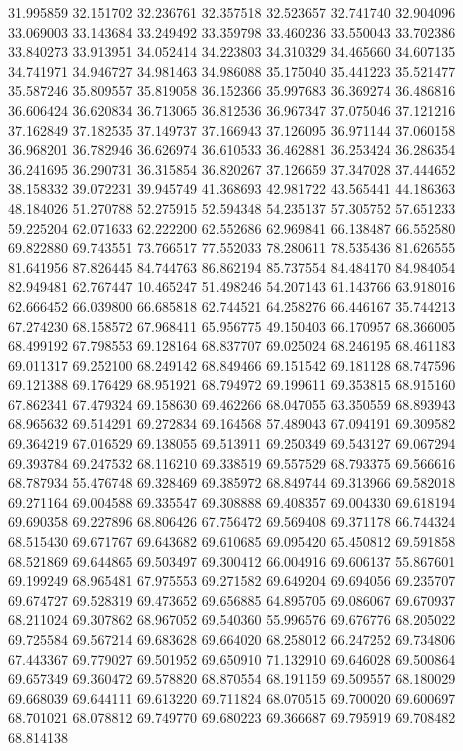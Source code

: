 31.995859
32.151702
32.236761
32.357518
32.523657
32.741740
32.904096
33.069003
33.143684
33.249492
33.359798
33.460236
33.550043
33.702386
33.840273
33.913951
34.052414
34.223803
34.310329
34.465660
34.607135
34.741971
34.946727
34.981463
34.986088
35.175040
35.441223
35.521477
35.587246
35.809557
35.819058
36.152366
35.997683
36.369274
36.486816
36.606424
36.620834
36.713065
36.812536
36.967347
37.075046
37.121216
37.162849
37.182535
37.149737
37.166943
37.126095
36.971144
37.060158
36.968201
36.782946
36.626974
36.610533
36.462881
36.253424
36.286354
36.241695
36.290731
36.315854
36.820267
37.126659
37.347028
37.444652
38.158332
39.072231
39.945749
41.368693
42.981722
43.565441
44.186363
48.184026
51.270788
52.275915
52.594348
54.235137
57.305752
57.651233
59.225204
62.071633
62.222200
62.552686
62.969841
66.138487
66.552580
69.822880
69.743551
73.766517
77.552033
78.280611
78.535436
81.626555
81.641956
87.826445
84.744763
86.862194
85.737554
84.484170
84.984054
82.949481
62.767447
10.465247
51.498246
54.207143
61.143766
63.918016
62.666452
66.039800
66.685818
62.744521
64.258276
66.446167
35.744213
67.274230
68.158572
67.968411
65.956775
49.150403
66.170957
68.366005
68.499192
67.798553
69.128164
68.837707
69.025024
68.246195
68.461183
69.011317
69.252100
68.249142
68.849466
69.151542
69.181128
68.747596
69.121388
69.176429
68.951921
68.794972
69.199611
69.353815
68.915160
67.862341
67.479324
69.158630
69.462266
68.047055
63.350559
68.893943
68.965632
69.514291
69.272834
69.164568
57.489043
67.094191
69.309582
69.364219
67.016529
69.138055
69.513911
69.250349
69.543127
69.067294
69.393784
69.247532
68.116210
69.338519
69.557529
68.793375
69.566616
68.787934
55.476748
69.328469
69.385972
68.849744
69.313966
69.582018
69.271164
69.004588
69.335547
69.308888
69.408357
69.004330
69.618194
69.690358
69.227896
68.806426
67.756472
69.569408
69.371178
66.744324
68.515430
69.671767
69.643682
69.610685
69.095420
65.450812
69.591858
68.521869
69.644865
69.503497
69.300412
66.004916
69.606137
55.867601
69.199249
68.965481
67.975553
69.271582
69.649204
69.694056
69.235707
69.674727
69.528319
69.473652
69.656885
64.895705
69.086067
69.670937
68.211024
69.307862
68.967052
69.540360
55.996576
69.676776
68.205022
69.725584
69.567214
69.683628
69.664020
68.258012
66.247252
69.734806
67.443367
69.779027
69.501952
69.650910
71.132910
69.646028
69.500864
69.657349
69.360472
69.578820
68.870554
68.191159
69.509557
68.180029
69.668039
69.644111
69.613220
69.711824
68.070515
69.700020
69.600697
68.701021
68.078812
69.749770
69.680223
69.366687
69.795919
69.708482
68.814138
